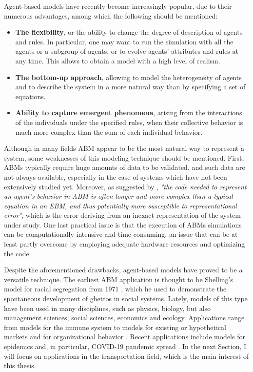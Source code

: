 Agent-based models have recently become increasingly popular, due to their numerous advantages, among which the following should be mentioned:
\begin{itemize}
    \item \textbf{The flexibility}, or the ability to change the degree of description of agents and rules. In particular, one may want to run the simulation with all the agents or a subgroup of agents, or to evolve agents' attributes and rules at any time. This allows to obtain a model with a high level of realism. 
    \item \textbf{The bottom-up approach}, allowing to model the heterogeneity of agents and to describe the system in a more natural way than by specifying a set of equations.
    \item \textbf{Ability to capture emergent phenomena}, arising from the interactions of the individuals under the specified rules, when their collective behavior is much more complex than the sum of each individual behavior. 
\end{itemize}
Although in many fields ABM appear to be the most natural way to represent a system, some weaknesses of this modeling technique should be mentioned. First, ABMs typically require huge amounts of data to be validated, and such data are not always available, especially in the case of systems which have not been extensively studied yet. Moreover, as suggested by \textcite{parunak}, \textit{"the code needed to represent an agent’s behavior in ABM is often longer and more complex than a typical equation in an EBM, and thus potentially more susceptible to representational error"}, which is the error deriving from an inexact representation of the system under study. One last practical issue is that the execution of ABMs simulations can be computationally intensive and time-consuming, an issue that can be at least partly overcome by employing adequate hardware resources and optimizing the code. 

Despite the aforementioned drawbacks, agent-based models have proved to be a versatile technique. The earliest ABM application is thought to be Shelling's model for racial segregation from 1971 \cite{shelling71}, which he used to demonstrate the spontaneous development of ghettos in social systems. Lately, models of this type have been used in many disciplines, such as physics, biology, but also management sciences, social sciences, economics and ecology. Applications range from models for the immune system \cite{Folcik2007TheBI} to models for existing or hypothetical markets \cite{Charania2006SubOrbitalST, markets2, market3} and for organizational behavior \cite{organization}. Recent applications include models for epidemics and, in particular, COVID-19 pandemic spread \cite{covid1, covid2, covid3}. In the next Section, I will focus on applications in the transportation field, which is the main interest of this thesis.


